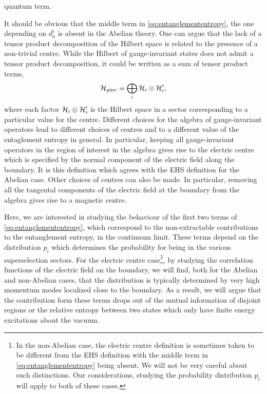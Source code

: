 quantum term.
\par It should be obvious that the middle term in
\eqref{eq:entanglemententropy}, the one depending on $d_a^i$ is absent in the
Abelian theory. One can argue that the lack of a tensor product decomposition
of the Hilbert space is related to the presence of a non-trivial centre. While
the Hilbert of gauge-invariant states does not admit a  tensor product
decomposition, it could be written as a sum of tensor product terms,
\begin{equation}
  \mathcal{H}_{g\mathrm{inv}} = \bigoplus_i\mathcal{H}_i\otimes\mathcal{H}_i',
  \label{eq:hilbertspacetensorproductterms}
\end{equation}
where each factor $\mathcal{H}_i\otimes\mathcal{H}_i'$ is the Hilbert space in 
a sector corresponding to a particular value for the centre. Different choices
for the algebra of gauge-invariant operators lead to different choices of
centres and to a different value of the entaglement entropy in general. In
particular, keeping all gauge-invariant operators in the region of interest in
the algebra gives rise to the electric centre which is specified by the normal
component of the electric field along the boundary. It is this definition
which agrees with the EHS definition for the Abelian case. Other choices of
centres can also be made. In particular, removing all the tangental components
of the electric field at the boundary from the algebra gives rise to a magnetic
centre.
\par Here, we are interested in studying the behaviour of the first two terms 
of \eqref{eq:entanglemententropy}, which correspond to the non-extractable
contributions to the entanglement entropy, in the continuum limit. These terms
depend on the distribution $p_i$ which determines the probability for being in
the various superselection sectors. For the electric centre case\footnote{In
  the non-Abelian case, the electric centre definition is sometimes taken to be
  different from the EHS definition with the middle term in
  \eqref{eq:entanglemententropy} being absent. We will not be very careful
  about such distinctions. Our considerations, studying the probability
distribution $p_i$ will apply to both of these cases.}, by studying the
correlation functions of the electric field on the boundary, we will find, both
for the Abelian and non-Abelian cases, that the distribution is typically 
determined by very high momentum modes localized close to the boundary. As
a result, we will argue that the contribution form these terms drops out of the
mutual information of disjoint regions or the relative entropy between two
states which only have finite energy excitations about the vacuum.
